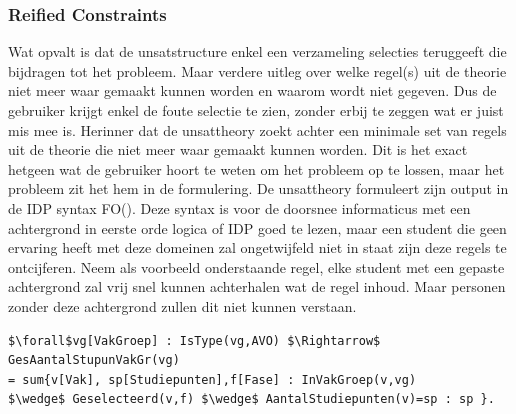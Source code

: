 \subsubsection{Reified Constraints}
\label{sec:reifiedconstraints}
Wat opvalt is dat de unsatstructure enkel een verzameling selecties teruggeeft die bijdragen tot het probleem. Maar verdere uitleg over welke regel(s) uit de theorie niet meer waar gemaakt kunnen worden en waarom wordt niet gegeven. Dus de gebruiker krijgt enkel de foute selectie te zien, zonder erbij te zeggen wat er juist mis mee is. Herinner dat de unsattheory zoekt achter een minimale set van regels uit de theorie die niet meer waar gemaakt kunnen worden. Dit is het exact hetgeen wat de gebruiker hoort te weten om het probleem op te lossen, maar het probleem zit het hem in de formulering. De unsattheory formuleert zijn output in de IDP syntax FO(\textperiodcentered). Deze syntax is voor de doorsnee informaticus met een achtergrond in eerste orde logica of IDP goed te lezen, maar een student die geen ervaring heeft met deze domeinen zal ongetwijfeld niet in staat zijn deze regels te ontcijferen. Neem als voorbeeld onderstaande regel, elke student met een gepaste achtergrond zal vrij snel kunnen achterhalen wat de regel inhoud. Maar personen zonder deze achtergrond zullen dit niet kunnen verstaan.
\lstset{basicstyle=\scriptsize}
\begin{lstlisting}[mathescape, caption=IDP Rule Example, frame=single]
$\forall$vg[VakGroep] : IsType(vg,AVO) $\Rightarrow$ GesAantalStupunVakGr(vg) 
= sum{v[Vak], sp[Studiepunten],f[Fase] : InVakGroep(v,vg) 
$\wedge$ Geselecteerd(v,f) $\wedge$ AantalStudiepunten(v)=sp : sp }.
\end{lstlisting}
